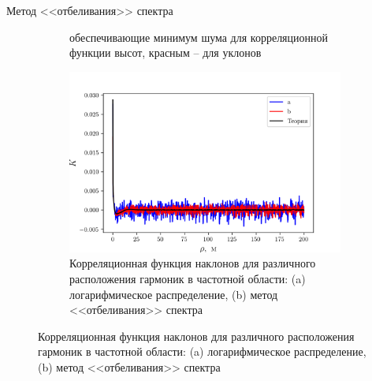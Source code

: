 \documentclass[10pt,pdf,hyperref={unicode}, dvipsnames]{beamer}
\begin{document}
\begin{frame}[t]{Метод <<отбеливания>> спектра}
\begin{figure}[h!]
\begin{subfigure}{0.45\linewidth}
{    обеспечивающие минимум шума для корреляционной функции высот, красным --
для уклонов}
    \end{subfigure}
    \hfill
    \begin{subfigure}{0.49\linewidth}
        \includegraphics[width=\linewidth]{fig/water/whitening}
        \caption*{\footnotesize Корреляционная функция наклонов для различного расположения
        гармоник в частотной области: (a) логарифмическое распределение, (b)
    метод <<отбеливания>> спектра}
    \end{subfigure}
\end{figure}
\end{frame}
\end{document}
